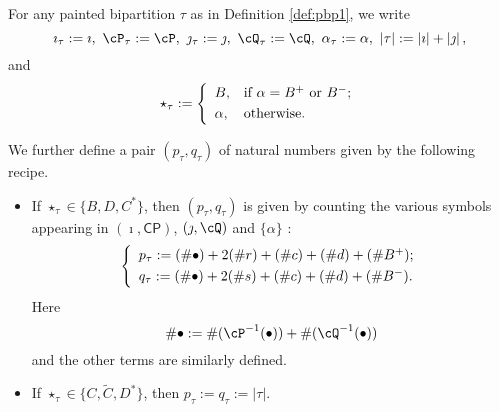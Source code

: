 \documentclass[12pt,a4paper]{amsart}
\def\abs#1{\left|{#1}\right|}
\newcommand{\CP}{{\mathcal {P}}}
\newcommand{\CQ}{{\mathcal {Q}}}
\numberwithin{equation}{section}
\theoremstyle{remark}
\newtheorem{remark}[thm]{Remark}
\def\CP{\mathsf{CP}}
\def\CQ{\overline{\sfA}}%
\begin{document}

For any painted bipartition $\tau$ as in Definition \ref{def:pbp1}, we write
\[
  \imath_\tau:=\imath,\ \cP_\tau:=\cP,\ \jmath_\tau:=\jmath,\ \cQ_\tau:=\cQ,\ \alpha_\tau:=\alpha,\ \abs{\tau}:=\abs{\imath}+\abs{\jmath},
\]
and
\[
  \star_\tau:= \left\{
    \begin{array}{ll}
      B, &\hbox{if $\alpha=B^+$ or $B^-$}; \smallskip\\
      \alpha, & \hbox{otherwise}.           \end{array}
  \right.
\]

We further define a pair $(p_{\tau}, q_{\tau})$ of natural numbers given by the
following recipe.
\begin{itemize}
  \item If $\star_\tau\in \{B, D, C^*\}$, then $(p_\tau, q_\tau)$ is given by
        counting the various symbols appearing in $(\imath, \CP)$,
        $(\jmath, \cQ)$ and $\{\alpha\}$ :
        \begin{equation*}%
          \left\{
            \begin{array}{l}
              p_\tau :=( \# \bullet)+ 2 (\# r) +(\# c )+ (\# d) + (\# B^+);\smallskip\\
              q_\tau :=( \# \bullet)+ 2 (\# s) + (\# c) + (\# d) + (\# B^-).\\
            \end{array}
          \right.
        \end{equation*}
        Here
        \[
        \#\bullet:=\#(\cP^{-1}(\bullet))+\#(\cQ^{-1}(\bullet))
        \]
        and the other terms are similarly defined.
  \item If $\star_\tau\in \{C, \widetilde C, D^*\}$, then
        $p_\tau:=q_\tau:=\abs{\tau}$.
\end{itemize}
\smallskip
\end{document}
